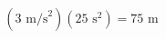\documentclass[preview]{standalone}
\begin{document}
\begin{align*}
(3 \text{ m/s}^2)(25 \text{ s}^2) = 75 \text{ m}
\end{align*}
\end{document}
